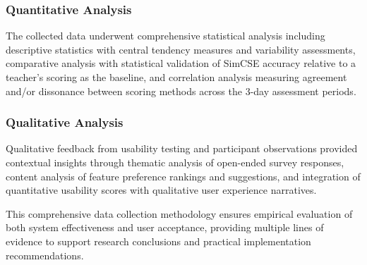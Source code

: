 {\subsubsection{Quantitative Analysis}

The collected data underwent comprehensive statistical analysis including descriptive statistics with central tendency measures and variability assessments, comparative analysis with statistical validation of SimCSE accuracy relative to a teacher's scoring as the baseline, and correlation analysis measuring agreement and/or dissonance between scoring methods across the 3-day assessment periods.

\subsubsection{Qualitative Analysis }

Qualitative feedback from usability testing and participant observations provided contextual insights through thematic analysis of open-ended survey responses, content analysis of feature preference rankings and suggestions, and integration of quantitative usability scores with qualitative user experience narratives.

This comprehensive data collection methodology ensures empirical evaluation of both system effectiveness and user acceptance, providing multiple lines of evidence to support research conclusions and practical implementation recommendations.
}

